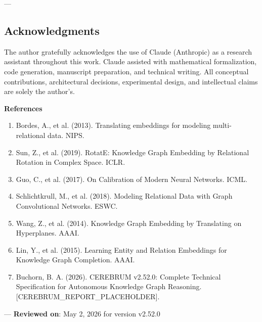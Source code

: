 ---
\subsection{Acknow\-ledgments}

The author gratefully ackno\-wledges the use of Claude (Anthropic) as a research assistant throughout this work. Claude assisted with mathe\-matical forma\-lization, code generation, manuscript preparation, and technical writing. All conceptual contr\-ibutions, archi\-tectural decisions, exper\-imental design, and intel\-lectual claims are solely the author's.

\textbf{References}
\begin{enumerate}
\item Bordes, A., et al. (2013). Translating embeddings for modeling multi-relational data. NIPS.
\item Sun, Z., et al. (2019). RotatE: Knowledge Graph Embedding by Relational Rotation in Complex Space. ICLR.
\item Guo, C., et al. (2017). On Calibration of Modern Neural Networks. ICML.
\item Schlic\-htkrull, M., et al. (2018). Modeling Relational Data with Graph Convol\-utional Networks. ESWC.
\item Wang, Z., et al. (2014). Knowledge Graph Embedding by Translating on Hyperplanes. AAAI.
\item Lin, Y., et al. (2015). Learning Entity and Relation Embeddings for Knowledge Graph Completion. AAAI.
\item Buchorn, B. A. (2026). CEREBRUM v2.52.0: Complete Technical Specif\-ication for Autonomous Knowledge Graph Reasoning. [CEREBRUM\_REPORT\_PLACEHOLDER].

\end{enumerate}
---
\textbf{Reviewed on}: May 2, 2026 for version v2.52.0
